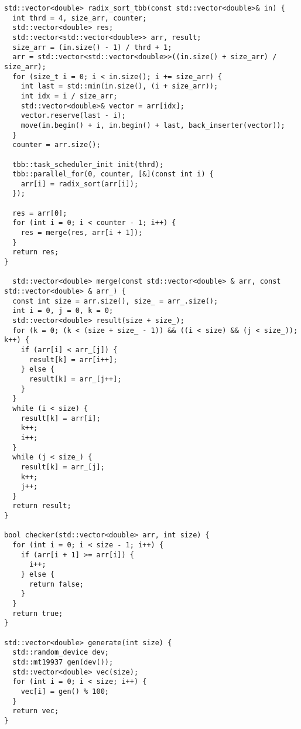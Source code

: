 \documentclass{report}
\begin{document}
\begin{lstlisting}
std::vector<double> radix_sort_tbb(const std::vector<double>& in) {
  int thrd = 4, size_arr, counter;
  std::vector<double> res;
  std::vector<std::vector<double>> arr, result;
  size_arr = (in.size() - 1) / thrd + 1;
  arr = std::vector<std::vector<double>>((in.size() + size_arr) / size_arr);
  for (size_t i = 0; i < in.size(); i += size_arr) {
    int last = std::min(in.size(), (i + size_arr));
    int idx = i / size_arr;
    std::vector<double>& vector = arr[idx];
    vector.reserve(last - i);
    move(in.begin() + i, in.begin() + last, back_inserter(vector));
  }
  counter = arr.size();

  tbb::task_scheduler_init init(thrd);
  tbb::parallel_for(0, counter, [&](const int i) {
    arr[i] = radix_sort(arr[i]);
  });

  res = arr[0];
  for (int i = 0; i < counter - 1; i++) {
    res = merge(res, arr[i + 1]);
  }
  return res;
}

  std::vector<double> merge(const std::vector<double> & arr, const std::vector<double> & arr_) {
  const int size = arr.size(), size_ = arr_.size();
  int i = 0, j = 0, k = 0;
  std::vector<double> result(size + size_);
  for (k = 0; (k < (size + size_ - 1)) && ((i < size) && (j < size_)); k++) {
    if (arr[i] < arr_[j]) {
      result[k] = arr[i++];
    } else {
      result[k] = arr_[j++];
    }
  }
  while (i < size) {
    result[k] = arr[i];
    k++;
    i++;
  }
  while (j < size_) {
    result[k] = arr_[j];
    k++;
    j++;
  }
  return result;
}

bool checker(std::vector<double> arr, int size) {
  for (int i = 0; i < size - 1; i++) {
    if (arr[i + 1] >= arr[i]) {
      i++;
    } else {
      return false;
    }
  }
  return true;
}

std::vector<double> generate(int size) {
  std::random_device dev;
  std::mt19937 gen(dev());
  std::vector<double> vec(size);
  for (int i = 0; i < size; i++) {
    vec[i] = gen() % 100;
  }
  return vec;
}

\end{lstlisting}
\end{document}
